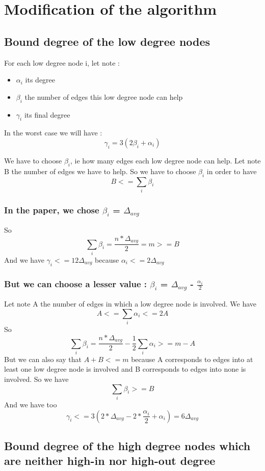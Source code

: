 \documentclass{article}
\begin{document}
\section{Modification of the algorithm}

\subsection{Bound degree of the low degree nodes}

For each low degree node i, let note :
\begin{itemize}
    \item $\alpha_i$ its degree
    \item $\beta_i$ the number of edges this low degree node can help
    \item $\gamma_i$ its final degree
\end{itemize}
In the worst case we will have : $$\gamma_i = 3(2\beta_i + \alpha_i)$$

We have to choose $\beta_i$, ie how many edges each low degree node
can help. Let note B the number of edges we have to help.
So we have to choose $\beta_i$ in order to have $$B <= \sum_{i} \beta_i$$

\subsubsection{In the paper, we chose $\beta_i$ = $\Delta_{avg}$}

So $$\sum_{i} \beta_i = \frac{n*\Delta_{avg}}{2} = m >= B$$
And we have $\gamma_i <= 12\Delta_{avg}$ because $\alpha_i <= 2\Delta_{avg}$

\subsubsection{But we can choose a lesser value : $\beta_i$ = $\Delta_{avg}$ - $\frac{\alpha_i}{2}$}

Let note A the number of edges in which a low degree node is involved.
We have $$A <= \sum_{i} \alpha_i <= 2A$$
So $$\sum_{i} \beta_i = \frac{n*\Delta_{avg}}{2} - \frac{1}{2}\sum_{i} \alpha_i >= m - A$$
But we can also say that $ A + B <= m$ because A corresponds to edges
into at least one low degree node is involved and B corresponds to edges
into none is involved. So we have $$\sum_{i} \beta_i >= B$$
And we have too
$$\gamma_i <= 3(2*\Delta_{avg}-2*\frac{\alpha_i}{2}+\alpha_i) = 6\Delta_{avg}$$

\subsection{Bound degree of the high degree nodes which are neither high-in nor high-out degree}
\end{document}

